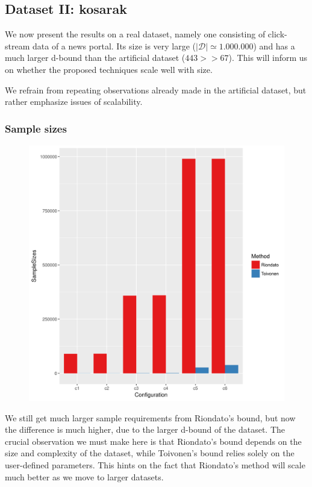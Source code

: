 \documentclass[11pt]{sigplanconf}
\newcommand\D{\mathcal{D}}
\begin{document}
\subsection{Dataset II: kosarak}
We now present the results on a real dataset, namely one consisting of click-stream data of a news portal. Its size is very large ($|\D| \simeq 1.000.000$) and has a much larger d-bound than the artificial dataset ($443 >> 67$). This will inform us on whether the proposed techniques scale well with size.

We refrain from repeating observations already made in the artificial dataset, but rather emphasize issues of scalability.

\subsubsection{Sample sizes}
\begin{figure}[h!]
\centering
\includegraphics[width=.7\columnwidth]{kosarak.dat/sampleSizes.png}
\end{figure}
We still get much larger sample requirements from Riondato's bound, but now the difference is much higher, due to the larger d-bound of the dataset. The crucial observation we must make here is that Riondato's bound depends on the size and complexity of the dataset, while Toivonen's bound relies solely on the user-defined parameters. This hints on the fact that Riondato's method will scale much better as we move to larger datasets.
\end{document}
